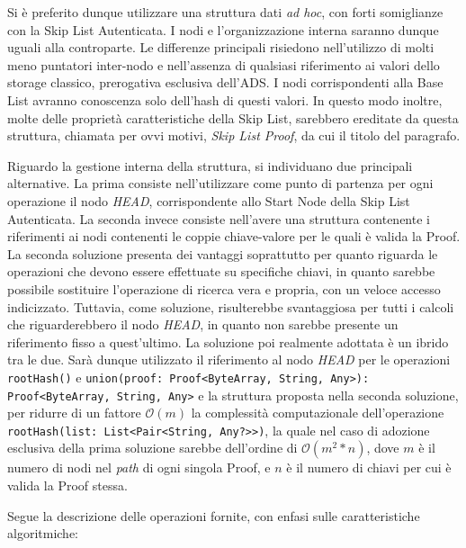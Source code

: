 		Si è preferito dunque utilizzare una struttura dati \textit{ad hoc}, con forti somiglianze con la Skip List Autenticata. I nodi e l'organizzazione interna saranno dunque uguali alla controparte. Le differenze principali risiedono nell'utilizzo di molti meno puntatori inter-nodo e nell'assenza di qualsiasi riferimento ai valori dello storage classico, prerogativa esclusiva dell'ADS. I nodi corrispondenti alla Base List avranno conoscenza solo dell'hash di questi valori.
		In questo modo inoltre, molte delle proprietà caratteristiche della Skip List, sarebbero ereditate da questa struttura, chiamata per ovvi motivi, \textit{Skip List Proof}, da cui il titolo del paragrafo.
		
		Riguardo la gestione interna della struttura, si individuano due principali alternative. La prima consiste nell'utilizzare come punto di partenza per ogni operazione il nodo \textit{HEAD}, corrispondente allo Start Node della Skip List Autenticata. La seconda invece consiste nell'avere una struttura contenente i riferimenti ai nodi contenenti le coppie chiave-valore per le quali è valida la Proof. La seconda soluzione presenta dei vantaggi soprattutto per quanto riguarda le operazioni che devono essere effettuate su specifiche chiavi, in quanto sarebbe possibile sostituire l'operazione di ricerca vera e propria, con un veloce accesso indicizzato. Tuttavia, come soluzione, risulterebbe svantaggiosa per tutti i calcoli che riguarderebbero il nodo \textit{HEAD}, in quanto non sarebbe presente un riferimento fisso a quest'ultimo. La soluzione poi realmente adottata è un ibrido tra le due. Sarà dunque utilizzato il riferimento al nodo \textit{HEAD} per le operazioni \verb!rootHash()! e \texttt{union(proof: Proof<ByteArray, String, Any>): Proof<ByteArray, String, Any>} e la struttura proposta nella seconda soluzione, per ridurre di un fattore $\mathcal{O}(m)$ la complessità computazionale dell'operazione \verb!rootHash(list: List<Pair<String, Any?>>)!, la quale nel caso di adozione esclusiva della prima soluzione sarebbe dell'ordine di $\mathcal{O}(m^{2}*n)$, dove $ m $ è il numero di nodi nel \textit{path} di ogni singola Proof, e $ n $ è il numero di chiavi per cui è valida la Proof stessa.
		
						
		Segue la descrizione delle operazioni fornite, con enfasi sulle caratteristiche algoritmiche:
		

